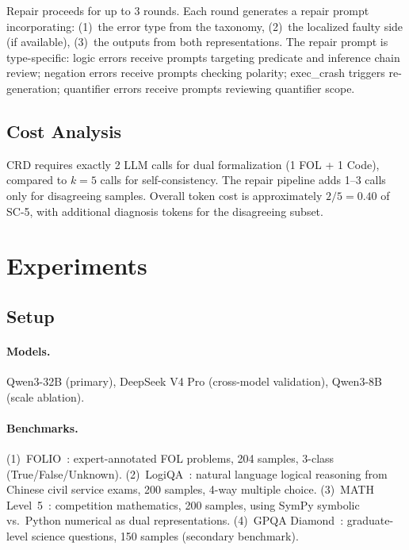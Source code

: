 \documentclass[11pt,a4paper]{article}
\newcommand{\method}{CRD}
\begin{document}
Repair proceeds for up to 3 rounds. Each round generates a repair prompt incorporating:
(1)~the error type from the taxonomy,
(2)~the localized faulty side (if available),
(3)~the outputs from both representations.
The repair prompt is type-specific: logic errors receive prompts targeting predicate and inference chain review; negation errors receive prompts checking polarity; exec\_crash triggers re-generation; quantifier errors receive prompts reviewing quantifier scope.

\subsection{Cost Analysis}

\method{} requires exactly 2 LLM calls for dual formalization (1 FOL + 1 Code), compared to $k\!=\!5$ calls for self-consistency. The repair pipeline adds 1--3 calls only for disagreeing samples. Overall token cost is approximately $2/5 = 0.40$ of SC-5, with additional diagnosis tokens for the disagreeing subset.

\section{Experiments}

\subsection{Setup}

\paragraph{Models.} Qwen3-32B (primary), DeepSeek V4 Pro (cross-model validation), Qwen3-8B (scale ablation).

\paragraph{Benchmarks.} (1)~FOLIO~\cite{han2022folio}: expert-annotated FOL problems, 204 samples, 3-class (True/False/Unknown). (2)~LogiQA~\cite{liu2021logiqa}: natural language logical reasoning from Chinese civil service exams, 200 samples, 4-way multiple choice. (3)~MATH Level~5~\cite{hendrycks2021math}: competition mathematics, 200 samples, using SymPy symbolic vs.\ Python numerical as dual representations. (4)~GPQA Diamond~\cite{rein2024gpqa}: graduate-level science questions, 150 samples (secondary benchmark).
\end{document}
